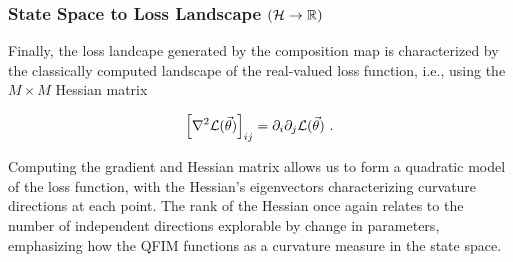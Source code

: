\subsubsection{State Space to Loss Landscape \((\mathcal{H} \to \mathbb{R})\)}

Finally, the loss landcape generated by the composition map is characterized by
the classically computed landscape of the real-valued loss function, i.e., using
the \(M\times M\) Hessian matrix

\begin{equation}
    \left[\nabla^2 \mathcal{L}(\vec{\theta}) \right]_{ij} = \partial_i\partial_j \mathcal{L}(\vec{\theta})~.
\end{equation}

Computing the gradient and Hessian matrix allows us to form a quadratic model of
the loss function, with the Hessian's eigenvectors characterizing curvature
directions at each point. The rank of the Hessian once again relates to the
number of independent directions explorable by change in parameters, emphasizing
how the QFIM functions as a curvature measure in the state space.
